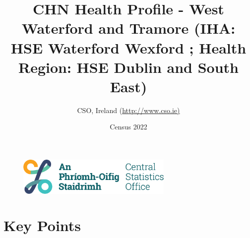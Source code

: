 \documentclass{article}
\title{CHN Health Profile - West Waterford and Tramore (IHA: HSE Waterford Wexford ;  Health Region: HSE Dublin and South East) }
\date{Census 2022}
\author{CSO, Ireland  (\url{http://www.cso.ie)}}
\begin{document}


\begin{figure}
	\centering
\includegraphics[width =75mm]{../figures/CSO_Logo.png}
\end{figure}

				 
		   
						  
														  
																																													
												 
			 
\maketitle
					
													   
				 
						 
																																																																											   
				 
				  
  \pagebreak
    	    \tableofcontents

\pagebreak


\section{Key Points}
\end{document}
